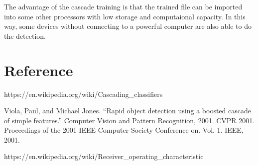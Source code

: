 \documentclass[11pt]{article}
\begin{document}
The advantage of the cascade training is that the trained file can be
imported into some other processors with low storage and computaional
capacity. In this way, some devices without connecting to a powerful
computer are also able to do the detection.

    \hypertarget{reference}{%
\section{Reference}\label{reference}}

    https://en.wikipedia.org/wiki/Cascading\_classifiers

Viola, Paul, and Michael Jones. ``Rapid object detection using a boosted
cascade of simple features.'' Computer Vision and Pattern Recognition,
2001. CVPR 2001. Proceedings of the 2001 IEEE Computer Society
Conference on. Vol. 1. IEEE, 2001.

https://en.wikipedia.org/wiki/Receiver\_operating\_characteristic


    
    
    
    
\end{document}
